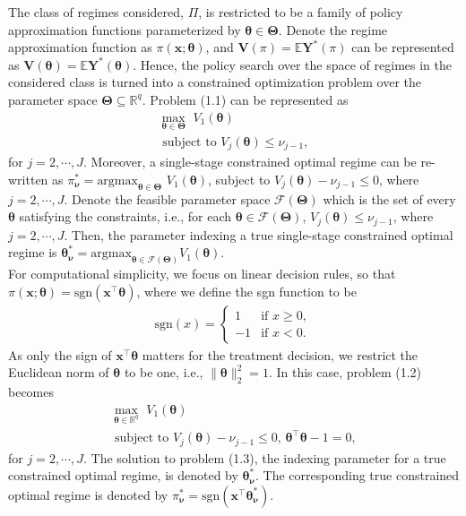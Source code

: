 \documentclass{article}
\newcommand{\itl}{\intercal}
\newcommand{\bs}{ \boldsymbol}
\newcommand{\mb}{\mathbb}
\newcommand{\ml}{\mathcal}
\newcommand{\lt}{\left}
\newcommand{\rt}{\right}
\begin{document}
 The class of regimes considered, $\Pi$, is restricted to be a family of policy approximation functions parameterized by $\bs{\theta} \in \bs{\Theta}$. Denote the regime approximation function as $\pi(\bs{x}; \bs{\theta})$, and $\bs{V}(\pi) = \mb{E} {\bs{Y}^{*}\lt(\pi\rt)}$ can be represented as $\bs{V}(\bs{\theta}) = \mb{E} {\bs{Y}^{*}\lt(\bs{\theta}\rt)}$. Hence, the policy search over the space of regimes in the considered class is turned into a constrained optimization problem over the parameter space $\bs{\Theta} \subseteq \mb{R}^q$. Problem (1.1) can be represented as 
 \begin{equation}
 \begin{gathered}
 \max_{\bs{\theta} \in \bs{\Theta}} \,\, V_1\lt(\bs{\theta}\rt) \\
 \text{ subject to } V_j\lt(\bs{\theta}\rt) \le \nu_{j-1},
 \end{gathered}
 \end{equation}  for $j = 2, \cdots, J$.  Moreover, a single-stage constrained optimal regime can be re-written as $\pi^*_{\bs{\nu}} = \text{argmax}_{\bs{\theta} \in \bs{\Theta}} \,\, V_1(\bs{\theta})$, subject to $V_j(\bs{\theta}) - \nu_{j-1} \le 0$, where $j = 2, \cdots, J$. Denote the feasible parameter space $\ml{F}(\bs{\Theta})$ which is the set of every $\bs{\theta}$ satisfying the constraints, i.e., for each $\bs{\theta} \in \ml{F}(\bs{\Theta})$, $V_j(\bs{\theta}) \le \nu_{j-1}$, where $j = 2, \cdots, J$. Then, the parameter indexing a true single-stage constrained optimal regime is $\bs{\theta}^*_{\bs{\nu}} = \text{argmax}_{\bs{\theta}\in \ml{F}(\bs{\Theta})}V_1\lt(\bs{\theta}\rt)$. \\
 
 For computational simplicity, we focus on linear decision rules, so that $\pi\lt(\bs{x};\bs{\theta}\rt)=\text{sgn}\lt(\bs{x}^{\itl}\bs{\theta}\rt)$, where we define the sgn function to be
 \begin{gather*}
 \text{sgn}(x)=\begin{cases}
  1 & \mbox{if }x\ge0,\\
 -1 & \mbox{if }x<0.
 \end{cases}
 \end{gather*}
 As only the sign of $\bs{x}^{\itl}\bs{\theta}$ matters for the treatment decision, we restrict the Euclidean norm of $\bs{\theta}$ to be one, i.e., $\| \bs{\theta} \|_2^2=1$. In this case, problem (1.2) becomes
\begin{equation}
\begin{gathered}
\max_{\bs{\theta} \in \mb{R}^q}\,\,  V_1\lt(\bs{\theta}\rt) \\
\text{ subject to }  V_j\lt(\bs{\theta}\rt) - \nu_{j-1} \le 0, \, \bs{\theta}^{\itl}\bs{\theta} - 1 =0,
\end{gathered}
\end{equation}
for $j = 2, \cdots, J$. The solution to problem (1.3), the indexing parameter for a true constrained optimal regime, is denoted by $\bs{\theta}_{\bs{\nu}}^*$. The corresponding true constrained optimal regime is denoted by $\pi_{\bs{\nu}}^* = \text{sgn}(\bs{x}^{\itl}\bs{\theta}_{\bs{\nu}}^*)$.
    
\end{document}
